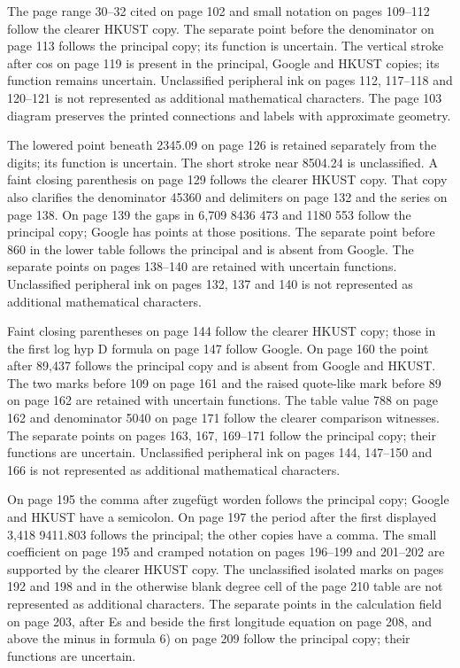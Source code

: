 The page range 30--32 cited on page 102 and small notation on pages
109--112 follow the clearer HKUST copy. The separate point before the
denominator on page 113 follows the principal copy; its function is
uncertain. The vertical stroke after cos on page 119 is present in the
principal, Google and HKUST copies; its function remains uncertain.
Unclassified peripheral ink on pages 112, 117--118 and 120--121 is not
represented as additional mathematical characters. The page 103 diagram
preserves the printed connections and labels with approximate geometry.

The lowered point beneath 2345.09 on page 126 is retained separately
from the digits; its function is uncertain. The short stroke near 8504.24
is unclassified. A faint closing parenthesis on page 129 follows the
clearer HKUST copy. That copy also clarifies the denominator 45360 and
delimiters on page 132 and the series on page 138.
On page 139 the gaps in 6,709 8436 473 and 1180 553 follow the principal
copy; Google has points at those positions. The separate point before
860 in the lower table follows the principal and is absent from Google.
The separate points on pages 138--140 are retained with uncertain functions.
Unclassified peripheral ink on pages 132, 137 and 140 is not represented
as additional mathematical characters.

Faint closing parentheses on page 144 follow the clearer HKUST copy;
those in the first log hyp D formula on page 147 follow Google.
On page 160 the point after 89,437 follows the principal copy and is absent
from Google and HKUST. The two marks before 109 on page 161 and the
raised quote-like mark before 89 on page 162 are retained with uncertain
functions. The table value 788 on page 162 and denominator 5040 on
page 171 follow the clearer comparison witnesses. The separate points
on pages 163, 167, 169--171 follow the principal copy; their functions
are uncertain. Unclassified peripheral ink on pages 144, 147--150 and
166 is not represented as additional mathematical characters.

On page 195 the comma after zugefügt worden follows the principal copy;
Google and HKUST have a semicolon. On page 197 the period after the first
displayed 3,418 9411.803 follows the principal; the other copies have a comma.
The small coefficient on page 195 and cramped notation on pages 196--199
and 201--202 are supported by the clearer HKUST copy. The unclassified
isolated marks on pages 192 and 198 and in the otherwise blank degree cell
of the page 210 table are not represented as additional characters.
The separate points in the calculation field on page 203, after Es and
beside the first longitude equation on page 208, and above the minus
in formula 6) on page 209 follow the principal copy; their functions are uncertain.


